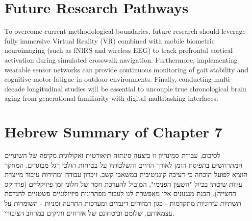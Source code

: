 \documentclass{custom_report}
\begin{document}
\section{Future Research Pathways}
To overcome current methodological boundaries, future research should leverage fully immersive Virtual Reality (VR) combined with mobile biometric neuroimaging (such as fNIRS and wireless EEG) to track prefrontal cortical activation during simulated crosswalk navigation. Furthermore, implementing wearable sensor networks can provide continuous monitoring of gait stability and cognitive-motor fatigue in outdoor environments. Finally, conducting multi-decade longitudinal studies will be essential to uncouple true chronological brain aging from generational familiarity with digital multitasking interfaces.

\section{Hebrew Summary of Chapter 7}
לסיכום, עבודת סמינריון זו ביצעה סינתזה תיאורטית ואקולוגית מקיפה של השינויים המתרחשים בתפיסת הזמן לאורך החיים והשלכותיו על בטיחות הולכי רגל מבוגרים. המחקר הוציא לפועל הוכחה כי דעיכה קוגניטיבית במשאבי קשב, זיכרון עבודה ומהירות עיבוד מייצרת עיוות שיטתי בכיול "השעון הפנימי", המוביל להערכת חסר של חלוני זמן פיזיקליים (פרדוקס החצייה). הבנת מנגנונים אלו מאפשרת לנו לעבור מפתרונות פיזיולוגיים פשטניים להנדסת תשתיות עירוניות מתקדמות - כגון רמזורים דינמיים ומערכות התרעה זמניות - השומרות על עצמאותם, שלומם וביטחונם של אזרחים ותיקים במרחב הציבורי.

\newpage
\end{document}
